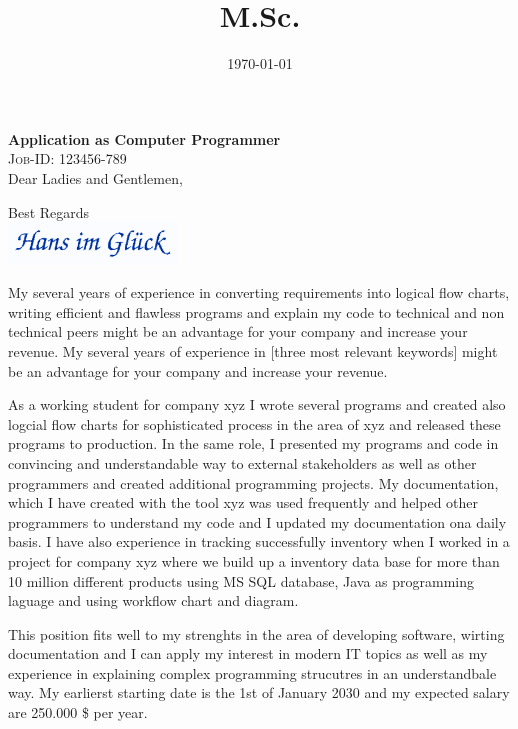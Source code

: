 \documentclass[11pt,a4paper,sans]{moderncv} %
\title{M.Sc.}                               %
\begin{document}




\date{\today}
\opening{\textbf{Application as Computer Programmer} \\\textsc{\scriptsize{Job-ID: 123456-789}}  \\ \vspace{0,5cm} Dear Ladies and Gentlemen, }
\closing{Best Regards \vspace{0,1cm} \\ \includegraphics[width=4.5cm]{unterschrift.png} \vspace{-1,5cm}}
\makelettertitle
\begin{justifying}

My several years of experience in converting requirements into logical flow charts, writing efficient and flawless programs and explain my code to technical and non technical peers might be an advantage for your company and increase your revenue. 
My several years of experience in [three most relevant keywords] might be an advantage for your company and increase your revenue. \newline

As a working student for company xyz I wrote several programs and created also logcial flow charts for sophisticated process in the area of xyz and released these programs to production. In the same role, I presented my programs and code in convincing and understandable way to external stakeholders as well as other programmers and created additional programming projects.
My documentation, which I have created with the tool xyz was used frequently and helped other programmers to understand my code and I updated my documentation ona daily basis.
I have also experience in tracking successfully inventory when I worked in a project for company xyz where we build up a inventory data base for more than 10 million different products using MS SQL database, Java as programming laguage and using workflow chart and diagram.\newline

This position fits well to my strenghts in the area of developing software, wirting documentation and I can apply my interest in modern IT topics as well as my experience in explaining complex programming strucutres in an understandbale way. My earlierst starting date is the 1st of January 2030 and my expected salary are 250.000 \$ per year.

\bigskip
\end{justifying}
\end{document}
